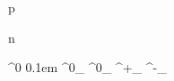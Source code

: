 

\newmathsymbol{\proton}     {p\xspace}
\newmathsymbol{\protonbar}  {\ovE{\proton}\xspace}
\newmathsymbol{\pp}         {\proton\proton\xspace}

\newmathsymbol{\neutron}    {n\xspace}
\newmathsymbol{\neutronbar} {\ovE{\neutron}\xspace}

\newmathsymbol{\Lambdaz}    {\Lambda^0\xspace}
\newmathsymbol{\Lambdazbar} {\ovE{\Lambdaz}\xspace}
\newmathsymbol{\Lambdabar}  {\kern 0.1em\ovE{\kern -0.1em\Lambda}{}\xspace}
\newmathsymbol{\Lambdab}    {\Lambda^0_\bquark\xspace}
\newmathsymbol{\Lambdabbar} {\Lambdabar^0_\bquark\xspace}
\newmathsymbol{\Lambdac}    {\Lambda^+_\cquark\xspace}
\newmathsymbol{\Lambdacbar} {\Lambdabar^-_\cquark\xspace}


